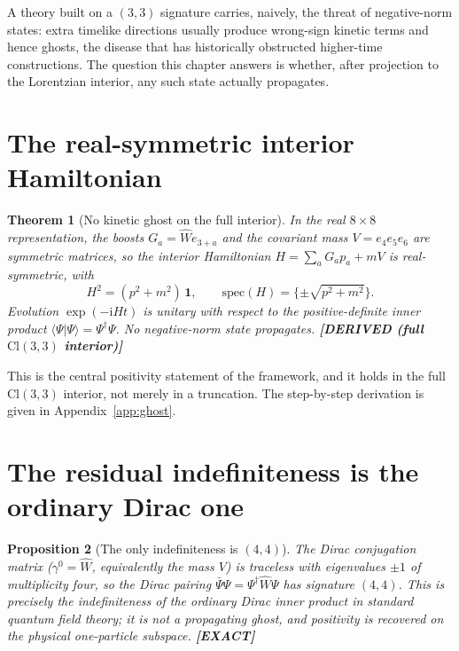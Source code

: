 \documentclass[11pt,oneside]{book}
\newcommand{\Wh}{\hat{W}}                         %
\newcommand{\Cl}{\mathrm{Cl}}                     %
\newcommand{\status}[1]{{\sffamily\bfseries\color{statuscol}[#1]}}
\theoremstyle{plain}
\newtheorem{theorem}{Theorem}[chapter]
\newtheorem{proposition}[theorem]{Proposition}
\theoremstyle{definition}
\theoremstyle{remark}
\begin{document}
A theory built on a $(3,3)$ signature carries, naively, the threat of negative-norm
states: extra timelike directions usually produce wrong-sign kinetic terms and
hence ghosts, the disease that has historically obstructed higher-time
constructions. The question this chapter answers is whether, after projection to
the Lorentzian interior, any such state actually propagates.

\section{The real-symmetric interior Hamiltonian}
\label{sec:real-symmetric}

\begin{theorem}[No kinetic ghost on the full interior]
\label{thm:no-ghost}
In the real $8\times8$ representation, the boosts $G_a=\Wh e_{3+a}$ and the
covariant mass $V=e_4e_5e_6$ are symmetric matrices, so the interior Hamiltonian
$H=\sum_a G_a p_a+mV$ is real-symmetric, with
\[
  H^2=(p^2+m^2)\,\mathbf 1,\qquad \mathrm{spec}(H)=\{\pm\sqrt{p^2+m^2}\}.
\]
Evolution $\exp(-\mathrm i Ht)$ is unitary with respect to the positive-definite
inner product $\langle\Psi|\Psi\rangle=\Psi^\dagger\Psi$. No negative-norm state
propagates. \status{DERIVED (full $\Cl(3,3)$ interior)}
\end{theorem}

This is the central positivity statement of the framework, and it holds in the full
$\Cl(3,3)$ interior, not merely in a truncation. The step-by-step derivation is
given in Appendix~\ref{app:ghost}.

\section{The residual indefiniteness is the ordinary Dirac one}
\label{sec:dirac-residual}

\begin{proposition}[The only indefiniteness is $(4,4)$]
\label{prop:44}
The Dirac conjugation matrix ($\gamma^0=\Wh$, equivalently the mass $V$) is
traceless with eigenvalues $\pm1$ of multiplicity four, so the Dirac pairing
$\bar\Psi\Psi=\Psi^\dagger\Wh\Psi$ has signature $(4,4)$. This is precisely the
indefiniteness of the ordinary Dirac inner product in standard quantum field
theory; it is not a propagating ghost, and positivity is recovered on the physical
one-particle subspace. \status{EXACT}
\end{proposition}
\end{document}

